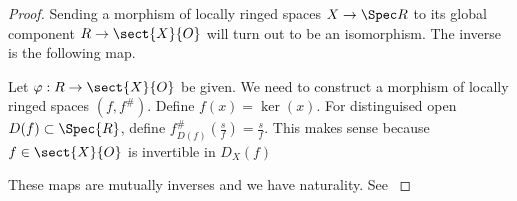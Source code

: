 
\begin{proof}
Sending a morphism of locally ringed spaces $X \rightarrow \Spec R$ to its global component $R \rightarrow \sect{X}{O}$
will turn out to be an isomorphism.
The inverse is the following map. 

Let $\varphi: R \rightarrow \sect{X}{O}$ be given.
We need to construct a morphism of locally ringed spaces $(f,f^{\#})$.
Define $f(x) = \ker(x)$.
For distinguised open $D(f)\subset \Spec{R}$,
define $f^{\#}_{D(f)}(\frac{s}{f}) = \frac{s}{f}$.
This makes sense because $f \in \sect{X}{O}$ is invertible in $D_X(f)$

These maps are mutually inverses and we have naturality.
See \cite[\href{http://stacks.math.columbia.edu/tag/01I1}{Tag 01I1}]{stacks}
\end{proof}